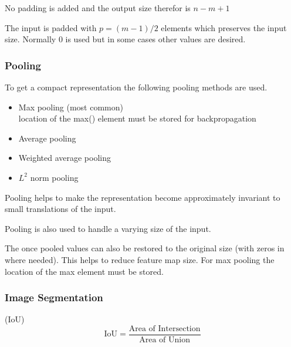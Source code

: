 No padding is added and the output size therefor is $n-m+1$

\newpar{}

The input is padded with $p=(m-1)/2$ elements which preserves the input size. Normally 0 is used but in some cases other values are desired.

\subsubsection{Pooling}
To get a compact representation the following pooling methods are used.
\begin{itemize}
    \item Max pooling (most common)
          \\ location of the max() element must be stored for backpropagation
    \item Average pooling
    \item Weighted average pooling
    \item $L^2$ norm pooling
\end{itemize}

Pooling helps to make the representation become approximately invariant to small translations of the input.

Pooling is also used to handle a varying size of the input.

\newpar{}

The once pooled values can also be restored to the original size (with zeros in where needed). This helps to reduce feature map size. For max pooling the location of the max element must be stored.

\subsubsection{Image Segmentation}

 (IoU)
\begin{equation*}
    \text{IoU} = \frac{\text{Area of Intersection}}{\text{Area of Union}}
\end{equation*}


